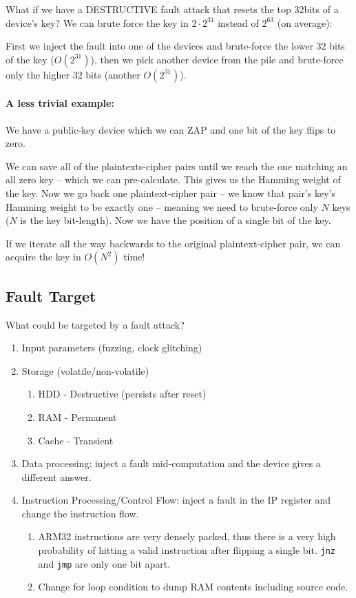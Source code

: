 What if we have a DESTRUCTIVE fault attack that resets the top 32bits of a device's key? We can brute force the key in $2\cdot2^{31}$ instead of $2^{63}$ (on average):

First we inject the fault into one of the devices and brute-force the lower 32 bits of the key ($O(2^{31})$), then we pick another device from the pile and brute-force only the higher 32 bits (another $O(2^{31})$).

\paragraph{A less trivial example:} We have a public-key device which we can ZAP and one bit of the key flips to zero.

We can save all of the plaintexts-cipher pairs until we reach the one matching an all zero key -- which we can pre-calculate. This gives us the Hamming weight of the key.
Now we go back one plaintext-cipher pair -- we know that pair's key's Hamming weight to be exactly one -- meaning we need to brute-force only $N$ keys ($N$ is the key bit-length). Now we have the position of a single bit of the key.

If we iterate all the way backwards to the original plaintext-cipher pair, we can acquire the key in $O(N^2)$ time!

\subsection{Fault Target} \label{subsec:fault_targets}
What could be targeted by a fault attack?
\begin{enumerate}
	\item Input parameters (fuzzing, clock glitching)
	\item Storage (volatile/non-volatile)
	\begin{enumerate}
		\item HDD - Destructive (persists after reset)
		\item RAM - Permanent
		\item Cache - Transient
	\end{enumerate}
	\item Data processing: inject a fault mid-computation and the device gives a different answer.
	\item Instruction Processing/Control Flow: inject a fault in the IP register and change the instruction flow.
	\begin{enumerate}
		\item ARM32 instructions are very densely packed, thus there is a very high probability of hitting a valid instruction after flipping a single bit. \texttt{jnz} and \texttt{jmp} are only one bit apart.
		\item Change for loop condition to dump RAM contents including source code.
	\end{enumerate}
\end{enumerate}

